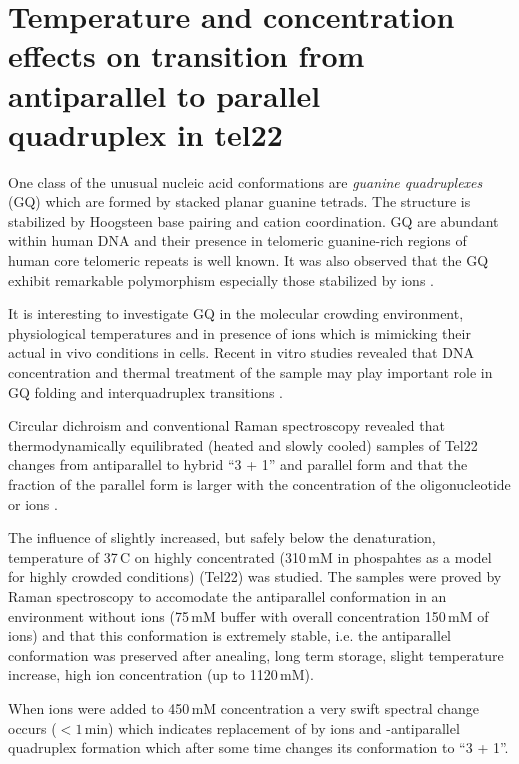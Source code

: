 \section[%
	Temperature and concentration effects on transition from antiparallel	to
	parallel quadruplex in tel22 (optional)
]{%
	Temperature and concentration effects on transition from antiparallel to
	parallel\\quadruplex in tel22
}

One class of the unusual nucleic acid conformations are
\emph{guanine quadruplexes} (GQ)
which are formed by stacked planar guanine tetrads.
The structure is stabilized by Hoogsteen base pairing and cation coordination.
GQ are abundant within human DNA and their presence in telomeric guanine-rich
regions of human core telomeric repeats  is well known.
It was also observed that the GQ exhibit remarkable polymorphism especially
those stabilized by  ions
\parencite{Chaires2013}.

It is interesting to investigate GQ in the molecular crowding environment,
physiological temperatures and in presence of  ions which is mimicking
their actual in vivo conditions in cells.
Recent in vitro studies revealed that DNA concentration and thermal treatment
of the sample may play important role in GQ folding and interquadruplex
transitions
\parencite{Palacky2013}.

Circular dichroism and conventional Raman spectroscopy revealed that
thermodynamically equilibrated (heated and slowly cooled) samples of Tel22
changes from antiparallel to hybrid “3 + 1” and parallel form and that
the fraction of the parallel form is larger with the concentration of the
oligonucleotide or  ions
\parencite{Palacky2013}.

The influence of slightly increased, but safely below the denaturation,
temperature of 37\,\textdegree{}C on highly concentrated (310\,mM
in phospahtes as a model for highly crowded conditions) 
(Tel22) was studied.
The samples were proved by Raman spectroscopy to accomodate the antiparallel
conformation in an environment without  ions (75\,mM 
buffer with overall concentration 150\,mM of  ions) and that this
conformation is extremely stable, i.e. the antiparallel conformation was
preserved after anealing, long term storage, slight temperature increase, high
 ion concentration (up to 1120\,mM).

When  ions were added to 450\,mM concentration a very swift spectral
change occurs ($< 1$\,min) which indicates replacement of  by
 ions and -antiparallel quadruplex formation which after
some time changes its conformation to “3 + 1”.


